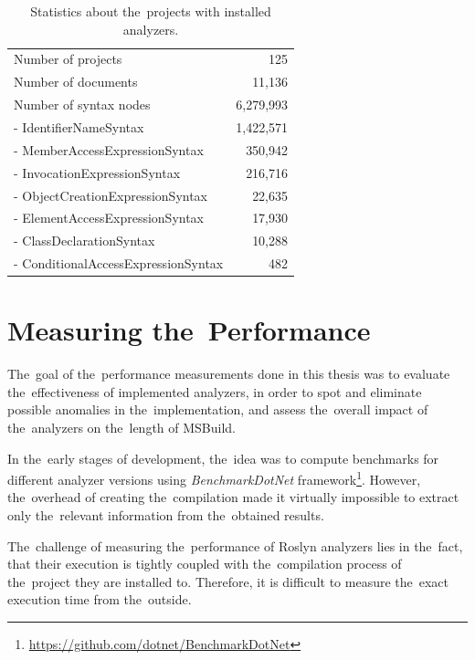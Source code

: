\documentclass[
  digital, %
  table,   %
  lof,     %
  lot,     %
  oneside,
]{fithesis3}
\begin{document}
\begin{table}
\begin{tabularx}{\textwidth}{Xr}
\toprule
Number of projects                  & 125 \\
Number of documents              & 11,136 \\
Number of syntax nodes        & 6,279,993 \\
- IdentifierNameSyntax        & 1,422,571 \\
- MemberAccessExpressionSyntax  & 350,942 \\
- InvocationExpressionSyntax     & 216,716 \\
- ObjectCreationExpressionSyntax & 22,635 \\ 
- ElementAccessExpressionSyntax  & 17,930 \\
- ClassDeclarationSyntax         & 10,288 \\ 
- ConditionalAccessExpressionSyntax & 482 \\

\bottomrule

\end{tabularx}
\caption{Statistics about the~projects with installed analyzers.}
\label{tab:solution-statistics}
\end{table}

\section{Measuring the~Performance}
The~goal of the~performance measurements done in this thesis was to evaluate the~effectiveness of implemented analyzers, in order to spot and eliminate possible anomalies in the~implementation, and assess the~overall impact of the~analyzers on the~length of MSBuild.

In the~early stages of development, the~idea was to compute benchmarks for different analyzer versions using \textit{BenchmarkDotNet} framework\footnote{\url{https://github.com/dotnet/BenchmarkDotNet}}. However, the~overhead of creating the~compilation made it virtually impossible to extract only the~relevant information from the~obtained results.

The~challenge of measuring the~performance of Roslyn analyzers lies in the~fact, that their execution is tightly coupled with the~compilation process of the~project they are installed to. Therefore, it is difficult to measure the~exact execution time from the~outside. 
\end{document}
